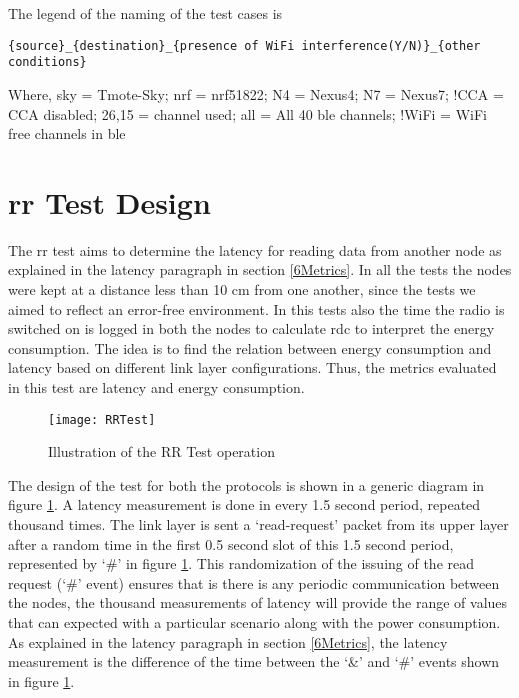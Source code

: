 The legend of the naming of the test cases is

\texttt{\{source\}\_\{destination\}\_\{presence of WiFi interference(Y/N)\}\_\{other conditions\}}

Where,
sky = Tmote-Sky;	nrf = nrf51822;	N4 = Nexus4; 		N7 = Nexus7;
!CCA = CCA disabled; 26,15 = channel used; all = All 40 \gls{ble}  channels;	!WiFi = WiFi free channels in \gls{ble} 


\section{\acrfull{rr} Test Design} \label{6RRdesign}
The \gls{rr} test aims to determine the latency for reading data from another node as explained in the latency paragraph in section \ref{6Metrics}. In all the tests the nodes were kept at a distance less than 10 cm from one another, since the tests we aimed to reflect an error-free environment. In this tests also the time the radio is switched on is logged in both the nodes to calculate \gls{rdc} to interpret the energy consumption. The idea is to find the relation between energy consumption and latency based on different link layer configurations. Thus, the metrics evaluated in this test are latency and energy consumption.

\begin{figure}[h]
\centering
\texttt{[image: RRTest]}
\caption{Illustration of the RR Test operation}
\label{fig:RRTest}
\end{figure}

The design of the test for both the protocols is shown in a generic diagram in figure \ref{fig:RRTest}. A latency measurement is done in every 1.5 second period, repeated thousand times. The link layer is sent a `read-request' packet from its upper layer after a random time in the first 0.5 second slot of this 1.5 second period, represented by `\#' in figure \ref{fig:RRTest}. This randomization of the issuing of the read request (`\#' event) ensures that is there is any periodic communication between the nodes, the thousand measurements of latency will provide the range of values that can expected with a particular scenario along with the power consumption. As explained in the latency paragraph in section \ref{6Metrics}, the latency measurement is the difference of the time between the `\&' and `\#' events shown in figure \ref{fig:RRTest}.


